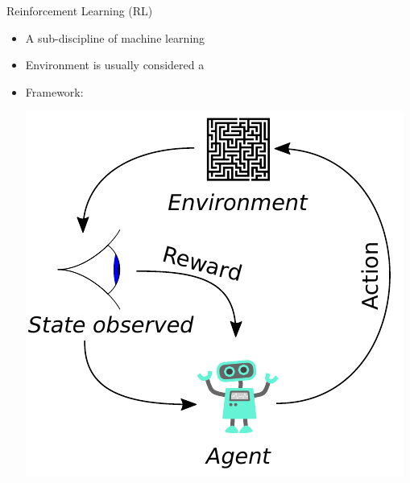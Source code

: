 \documentclass[aspectratio=1610]{beamer}
\renewcommand{\footnotesize}{\scriptsize}
\begin{document}



\begin{frame}{Reinforcement Learning (RL)}
	\begin{itemize}
		\item A sub-discipline of machine learning
		\item Environment is usually considered a 
		\item Framework:\\
		\begin{minipage}[c]{0.45\textwidth}
			\includegraphics[width=\linewidth]{figures/reinforcement_learning}
		\end{minipage} \hfill
		\begin{minipage}[c]{0.20\textwidth}

\end{minipage}
\end{itemize}
\end{frame}
\end{document}

